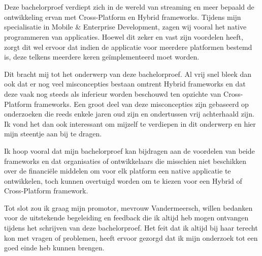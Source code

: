 
\chapter*{}%
\label{ch:voorwoord}


Deze bachelorproef verdiept zich in de wereld van streaming en meer bepaald de ontwikkeling ervan met Cross-Platform en Hybrid frameworks. Tijdens mijn specialisatie in Mobile \& Enterprise Development, zagen wij vooral het native programmeren van applicaties. Hoewel dit zeker en vast zijn voordelen heeft, zorgt dit wel ervoor dat indien de applicatie voor meerdere platformen bestemd is, deze telkens meerdere keren geïmplementeerd moet worden.

Dit bracht mij tot het onderwerp van deze bachelorproef. Al vrij snel bleek dan ook dat er nog veel misconcepties bestaan omtrent Hybrid frameworks en dat deze vaak nog steeds als inferieur worden beschouwd ten opzichte van Cross-Platform frameworks. Een groot deel van deze misconcepties zijn gebaseerd op onderzoeken die reeds enkele jaren oud zijn en ondertussen vrij achterhaald zijn. Ik vond het dan ook interessant om mijzelf te verdiepen in dit onderwerp en hier mijn steentje aan bij te dragen.

Ik hoop vooral dat mijn bachelorproef kan bijdragen aan de voordelen van beide frameworks en dat organisaties of ontwikkelaars die misschien niet beschikken over de financiële middelen om voor elk platform een native applicatie te ontwikkelen, toch kunnen overtuigd worden om te kiezen voor een Hybrid of Cross-Platform framework.

Tot slot zou ik graag mijn promotor, mevrouw Vandermeersch, willen bedanken voor de uitstekende begeleiding en feedback die ik altijd heb mogen ontvangen tijdens het schrijven van deze bachelorproef. Het feit dat ik altijd bij haar terecht kon met vragen of problemen, heeft ervoor gezorgd dat ik mijn onderzoek tot een goed einde heb kunnen brengen.